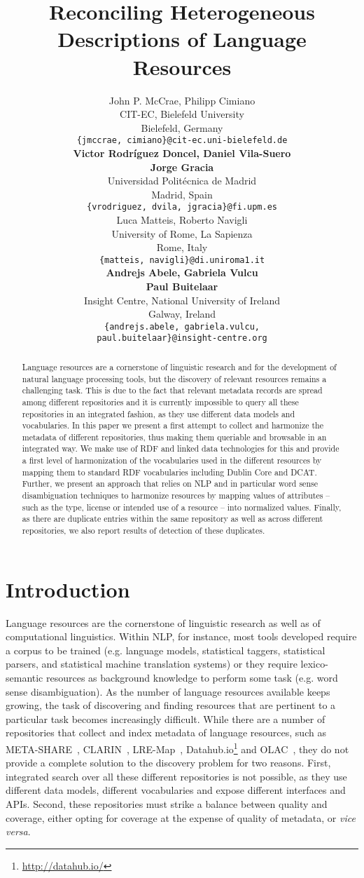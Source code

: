 \documentclass[11pt]{article}
\title{Reconciling Heterogeneous Descriptions of Language Resources}
\author{John P. McCrae, Philipp Cimiano \\
  CIT-EC, Bielefeld University \\
  Bielefeld, Germany \\
  {\scriptsize\tt\{jmccrae, cimiano\}@cit-ec.uni-bielefeld.de} \\
  {\bf Victor Rodr\'iguez Doncel, Daniel Vila-Suero}\\
  {\bf Jorge Gracia} \\
  Universidad Polit\'ecnica de Madrid \\
  Madrid, Spain \\
  {\scriptsize\tt\{vrodriguez, dvila, jgracia\}@fi.upm.es} \\\And
  Luca Matteis, Roberto Navigli \\
  University of Rome, La Sapienza \\
  Rome, Italy \\
  {\scriptsize\tt \{matteis, navigli\}@di.uniroma1.it} \\
  {\bf Andrejs Abele, Gabriela Vulcu}\\
  {\bf Paul Buitelaar} \\
  Insight Centre, National University of Ireland\\
  Galway, Ireland \\
  {\scriptsize\tt \{andrejs.abele, gabriela.vulcu,}\\
  {\scriptsize\tt paul.buitelaar\}@insight-centre.org} \\}
\date{}
\begin{document}
\maketitle
\begin{abstract}
        Language resources are a cornerstone of linguistic research and for the
        development of natural language processing tools, 
	but the discovery of relevant resources remains a challenging task.
        This is due to the fact that relevant metadata records are spread among
        different repositories and it is currently impossible to query all these
        repositories in an integrated fashion, as they use different data
        models and vocabularies. In this paper we present a first attempt to
        collect and harmonize the metadata of different repositories, thus
        making them queriable and browsable in an integrated way. We make use
        of RDF and linked data technologies for this and provide a first level
        of harmonization of the vocabularies used in the different resources by
        mapping them to standard RDF vocabularies including Dublin Core and
        DCAT. Further, we present an approach that relies on NLP and in
        particular word sense disambiguation techniques to harmonize resources
        by mapping values of attributes -- such as the type, license or intended
        use of a resource -- into normalized values. Finally, as there are
        duplicate entries within the same repository as well as across different
        repositories, we also report results of detection of these duplicates.
\end{abstract}

\section{Introduction}

Language resources are the cornerstone of linguistic research as well as of
computational linguistics. Within NLP, for instance, most tools developed
require a corpus to be trained (e.g. language models, statistical taggers,
statistical parsers, and statistical machine translation systems) or they
require lexico-semantic resources as background knowledge to perform some task
(e.g. word sense disambiguation). 
As the number of language resources available keeps growing, the task of
discovering and finding resources that are pertinent to a particular task
becomes increasingly difficult. While there are a number of repositories that
collect and index metadata of language resources, such as
META-SHARE~\cite{federmann2012meta},
CLARIN~\cite{broeder2010data}, LRE-Map~\cite{calzolari2012lre},
Datahub.io\footnote{\url{http://datahub.io/}} and OLAC~\cite{simons2003open}, they do not provide a complete
solution to the discovery problem for two reasons. First, integrated search over
all these different repositories is not possible, as they use different data
models, different vocabularies and expose different interfaces and APIs. 
Second, these repositories must strike a balance between quality and coverage,
either opting for coverage at the expense of quality of metadata, or \emph{vice
versa}.
\end{document}
